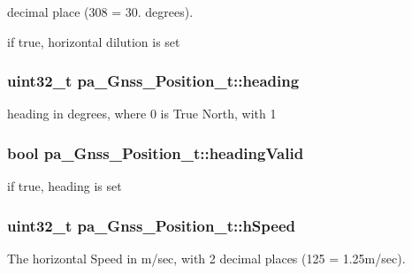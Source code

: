 decimal place (308 = 30. degrees). 

if true, horizontal dilution is set 
\subsubsection[{\texorpdfstring{heading}{heading}}]{\setlength{\rightskip}{0pt plus 5cm}uint32\+\_\+t pa\+\_\+\+Gnss\+\_\+\+Position\+\_\+t\+::heading}\hypertarget{structpa___gnss___position__t_a237b9c9795926a4952d56446ced2a466}{}\label{structpa___gnss___position__t_a237b9c9795926a4952d56446ced2a466}
heading in degrees, where 0 is True North, with 1 
\subsubsection[{\texorpdfstring{heading\+Valid}{headingValid}}]{\setlength{\rightskip}{0pt plus 5cm}bool pa\+\_\+\+Gnss\+\_\+\+Position\+\_\+t\+::heading\+Valid}\hypertarget{structpa___gnss___position__t_acd0e195757c5fae78484df73ffbb022a}{}\label{structpa___gnss___position__t_acd0e195757c5fae78484df73ffbb022a}


if true, heading is set 

\subsubsection[{\texorpdfstring{h\+Speed}{hSpeed}}]{\setlength{\rightskip}{0pt plus 5cm}uint32\+\_\+t pa\+\_\+\+Gnss\+\_\+\+Position\+\_\+t\+::h\+Speed}\hypertarget{structpa___gnss___position__t_a892ce41c9bccf91bd72deb4dce3ea235}{}\label{structpa___gnss___position__t_a892ce41c9bccf91bd72deb4dce3ea235}
The horizontal Speed in m/sec, with 2 decimal places (125 = 1.\+25m/sec). 
